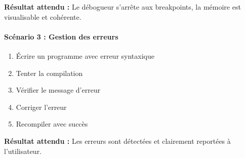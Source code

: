 \textbf{Résultat attendu :} Le débogueur s'arrête aux breakpoints, la mémoire est visualisable et cohérente.

\paragraph{Scénario 3 : Gestion des erreurs}
\begin{enumerate}
    \item Écrire un programme avec erreur syntaxique
    \item Tenter la compilation
    \item Vérifier le message d'erreur
    \item Corriger l'erreur
    \item Recompiler avec succès
\end{enumerate}

\textbf{Résultat attendu :} Les erreurs sont détectées et clairement reportées à l'utilisateur.
